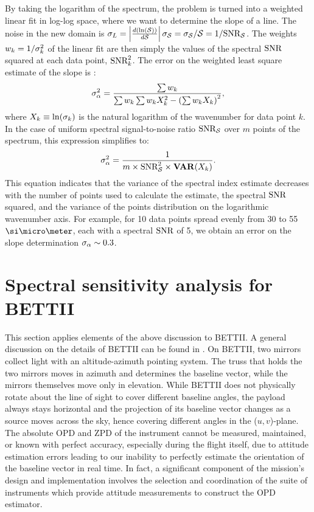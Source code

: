 By taking the logarithm of the spectrum, the problem is turned into a weighted linear fit in log-log space, where we want to determine the slope of a line. The noise in the new domain is $\sigma_L = \left|\frac{d(\ln(\mathcal{S}))}{d\mathcal{S}}\right|\sigma_\mathcal{S} = \sigma_\mathcal{S}/\mathcal{S} = 1/\textrm{SNR}_{\mathcal{S}}$. The weights $w_k = 1/\sigma_k^2$ of the linear fit are then simply the values of the spectral $\textrm{SNR}$ squared at each data point, $\textrm{SNR}^2_k$. The error on the weighted least square estimate of the slope is \citep{Bevington:2003tc}:
\begin{equation}
\sigma_\alpha^2 = \frac{\sum w_k}{\sum w_k\sum w_k X_k^2 - \left(\sum w_k X_k\right)^2},
\end{equation}
where $X_ k \equiv \ln(\sigma_k)$ is the natural logarithm of the wavenumber for data point $k$. In the case of uniform spectral signal-to-noise ratio $\textrm{SNR}_{\mathcal{S}}$ over $m$ points of the spectrum, this expression simplifies to:
\begin{equation}
\sigma_\alpha^2 = \frac{1}{m\times\textrm{SNR}^2_{\mathcal{S}}\times\mathbf{VAR}(X_k)}.
\end{equation}
This equation indicates that the variance of the spectral index estimate decreases with the number of points used to calculate the estimate, the spectral $\textrm{SNR}$ squared, and the variance of the points distribution on the logarithmic wavenumber axis. For example, for 10 data points spread evenly from 30 to 55~$\um$, each with a spectral $\textrm{SNR}$ of 5, we obtain an error on the slope determination $\sigma_\alpha\sim 0.3$.

\section{Spectral sensitivity analysis for BETTII}
\label{sec:implications}
This section applies elements of the above discussion to BETTII. A general discussion on the details of BETTII can be found in \citep{Rinehart:2014gk}.
On BETTII, two mirrors collect light with an altitude-azimuth pointing system. The truss that holds the two mirrors moves in azimuth and determines the baseline vector, while the mirrors themselves move only in elevation. While BETTII does not physically rotate about the line of sight to cover different baseline angles, the payload always stays horizontal and the projection of its baseline vector changes as a source moves across the sky, hence covering different angles in the ($u, v$)-plane. The absolute OPD and ZPD of the instrument cannot be
measured, maintained, or known with perfect accuracy, especially during the flight itself, due to attitude estimation errors leading to our inability to perfectly estimate the orientation of the baseline vector in real time. In fact, a significant component of the mission's
design and implementation involves the selection and coordination of the suite of instruments which provide attitude measurements to construct the OPD estimator.

